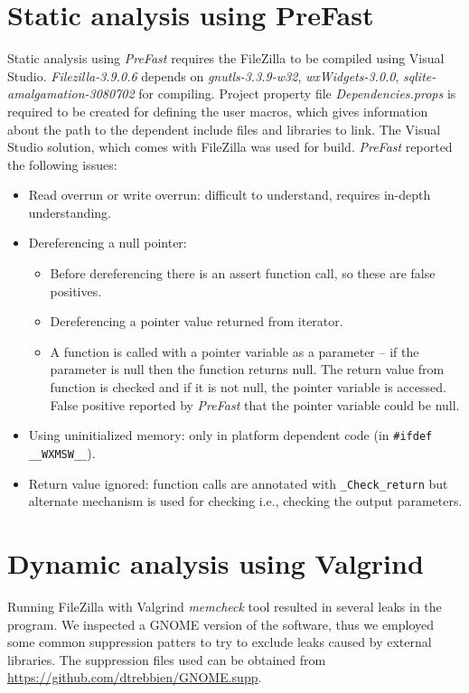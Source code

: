 \documentclass[11pt]{article}
\begin{document}
\section{Static analysis using PreFast}
Static analysis using \textit{PreFast} requires the FileZilla to be compiled using Visual Studio. \textit{Filezilla-3.9.0.6} depends on \textit{gnutls-3.3.9-w32}, \textit{wxWidgets-3.0.0}, \textit{sqlite-amalgamation-3080702} for compiling. Project property file \textit{Dependencies.props} is required to be created for defining the user macros, which gives information about the path to the dependent include files and libraries to link. The Visual Studio solution, which comes with FileZilla was used for build. \textit{PreFast} reported the following issues:
\begin{itemize}[topsep=0pt, itemsep=0pt]
 \item Read overrun or write overrun: difficult to understand, requires in-depth understanding.
 \item Dereferencing a null pointer: 
	\begin{itemize}[topsep=0pt, itemsep=0pt]
		\item Before dereferencing there is an assert function call, so these are false positives.
		\item Dereferencing a pointer value returned from iterator.
		\item A function is called with a pointer variable as a parameter -- if the parameter is null then the function returns null. The return value from function is checked and if it is not null, the pointer variable is accessed. False positive reported by \textit{PreFast} that the pointer variable could be null.
	\end{itemize}
 \item Using uninitialized memory: only in platform dependent code (in \texttt{\#ifdef \_\_WXMSW\_\_}).
 \item Return value ignored: function calls are annotated with \texttt{\_Check\_return} but alternate mechanism is used for checking i.e., checking the output parameters.
\end{itemize}

\section{Dynamic analysis using Valgrind}

Running FileZilla with Valgrind \textit{memcheck} tool resulted in several leaks in the program. We inspected a GNOME version of the software, thus we employed some common suppression patters to try to exclude leaks caused by external libraries. The suppression files used can be obtained from \url{https://github.com/dtrebbien/GNOME.supp}.
\end{document}
